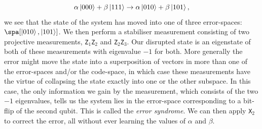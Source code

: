 \documentclass{report}
\begin{document}
\begin{equation}
    \alpha\ket{0 0 0} + \beta\ket{1 1 1} \rightarrow \alpha\ket{0 1 0} + \beta\ket{1 0 1},
\end{equation}
we see that the state of the system has moved into one of three error-spaces: $\spa[\ket{0 1 0}, \ket{1 0 1}]$. We then perform a stabiliser measurement consisting of two projective measurements, \texttt{Z$_1$Z$_2$} and \texttt{Z$_2$Z$_3$}. Our disrupted state is an eigenstate of both of these measurements with eigenvalue $-1$ for both. More generally the error might move the state into a superposition of vectors in more than one of the error-spaces and/or the code-space, in which case these measurements have the virtue of collapsing the state exactly into one or the other subspace. In this case, the only information we gain by the measurement, which consists of the two $-1$ eigenvalues, tells us the system lies in the error-space corresponding to a bit-flip of the second qubit. This is called the \textit{error syndrome}. We can then apply \texttt{X$_2$} to correct the error, all without ever learning the values of $\alpha$ and $\beta$. 
\end{document}
